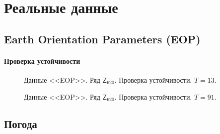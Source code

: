 \documentclass[specialist,
               substylefile = spbu.rtx,
               subf,href,colorlinks=true, 12p]{disser}
\begin{document}
\chapter{Реальные данные}

\section{Earth Orientation Parameters (EOP)}
\label{aeop}
\subsubsection{Проверка устойчивости}
\label{aeop_rob}
\begin{figure}[H]
	\caption{Данные <<EOP>>. Ряд $\mathsf{Z}_{620}$. Проверка устойчивости. $T = 13$.}
	\label{loop13}
\end{figure}

\begin{figure}[H]
	\caption{Данные <<EOP>>. Ряд $\mathsf{Z}_{620}$. Проверка устойчивости. $T = 91$.}
	\label{loop91}
\end{figure}

\section{Погода}
\label{aweather}
\end{document}
